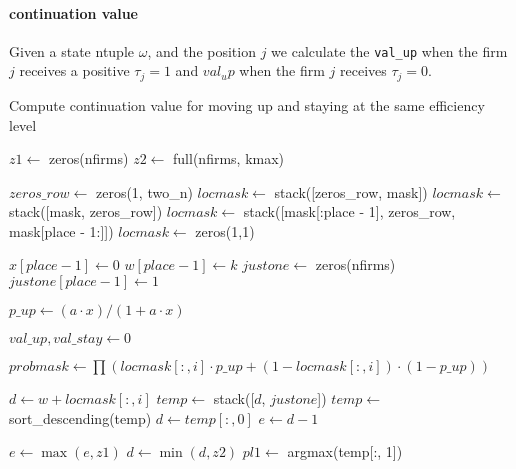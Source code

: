 \documentclass[12pt]{article}[margin=1in]
\begin{document}
\paragraph{continuation value} Given a state ntuple $\omega$, and the position $j$ we calculate the \verb|val_up| when the firm $j$ receives a positive $\tau_j=1$ and $val_up$ when the firm $j$ receives $\tau_j=0$.
\begin{algorithm}
    \caption{Compute continuation value for moving up and staying at the same efficiency level}
    \begin{algorithmic}[1]
        \State $z1 \gets$ zeros(nfirms) 
        \State $z2 \gets$ full(nfirms, kmax) 

        \State $zeros\_row \gets$ zeros(1, two\_n)
        \State $locmask \gets$ stack([zeros\_row, mask])
        \State $locmask \gets$ stack([mask, zeros\_row])
        \Else
        \State $locmask \gets$ stack([mask[:place - 1], zeros\_row, mask[place - 1:]])
        \EndIf
        \Else
        \State $locmask \gets$ zeros(1,1)
        \EndIf

        \State $x[place - 1] \gets 0$ 
        \State $w[place - 1] \gets k$ 
        \State $justone \gets$ zeros(nfirms)
        \State $justone[place - 1] \gets 1$ 

        \State $p\_up \gets (a \cdot x) / (1 + a \cdot x)$ 

        \State $val\_up, val\_stay \gets 0$

        \State $probmask \gets \prod (locmask[:, i] \cdot p\_up + (1 - locmask[:, i]) \cdot (1 - p\_up))$

        \State $d \gets w + locmask[:, i]$ 
        \State $temp \gets$ stack([$d$, $justone$])
        \State $temp \gets$ sort\_descending(temp)
        \State $d \gets temp[:, 0]$
        \State $e \gets d - 1$ 

        \State $e \gets \max(e, z1)$
        \State $d \gets \min(d, z2)$
        \State $pl1 \gets$ argmax(temp[:, 1]) 


\end{algorithmic}
\end{algorithm}
\end{document}
